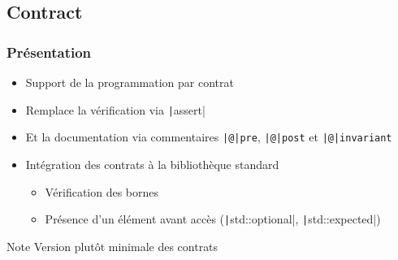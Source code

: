 \documentclass[C++.tex]{subfiles}
\begin{document}
\subsection*{Contract}
\begin{frame}[fragile]
	\frametitle{Présentation}
	\begin{itemize}
		\item Support de la programmation par contrat
		\item Remplace la vérification via \texttt|assert|
		\item Et la documentation via commentaires \texttt{|@|pre}, \texttt{|@|post} et \texttt{|@|invariant}
		\item Intégration des contrats à la bibliothèque standard
		\begin{itemize}
			\item Vérification des bornes
			\item Présence d'un élément avant accès (\texttt|std::optional|, \texttt|std::expected|)
		\end{itemize}
	\end{itemize}

	\begin{block}{Note}
		Version plutôt minimale des contrats
	\end{block}

\end{frame}
\end{document}
